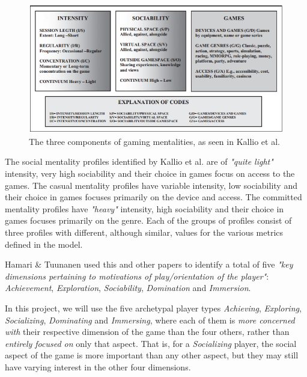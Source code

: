 \begin{figure}[h]
	\centering
	\includegraphics[width=\textwidth]{Figures/kallio-gaming-mentalities-model}
	\caption{The three components of gaming mentalities, as seen in Kallio et al. \cite{kallio2011gamermentalities}}
	\label{fig:kallio-gamer-mentalities-model}
\end{figure}

The social mentality profiles identified by Kallio et al. are of \emph{"quite light"} intensity, very high sociability and their choice in games focus on access to the games. The casual mentality profiles have variable intensity, low sociability and their choice in games focuses primarily on the device and access. The committed mentality profiles have \emph{"heavy"} intensity, high sociability and their choice in games focuses primarily on the genre. Each of the groups of profiles consist of three profiles with different, although similar, values for the various metrics defined in the model. 

Hamari \& Tuunanen \cite{hamari2014playertypes} used this and other papers to identify a total of five \emph{"key dimensions pertaining to motivations of play/orientation of the player"}: \emph{Achievement}, \emph{Exploration}, \emph{Sociability}, \emph{Domination} and \emph{Immersion}.

In this project, we will use the five archetypal player types \emph{Achieving}, \emph{Exploring}, \emph{Socializing}, \emph{Dominating} and \emph{Immersing}, where each of them is \emph{more concerned with} their respective dimension of the game than the four others, rather than \emph{entirely focused on} only that aspect. That is, for a \emph{Socializing} player, the social aspect of the game is more important than any other aspect, but they may still have varying interest in the other four dimensions.

